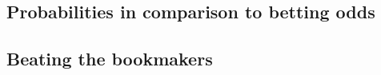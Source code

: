 \documentclass[conference]{IEEEtran}
\begin{document}
\subsection{Probabilities in comparison to betting odds}
\subsection{Beating the bookmakers}

%
%



%
%
\end{document}
